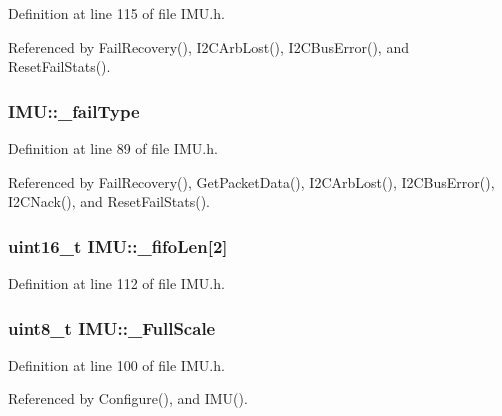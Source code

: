 Definition at line 115 of file IMU.h.



Referenced by FailRecovery(), I2CArbLost(), I2CBusError(), and ResetFailStats().

\hypertarget{class_i_m_u_a39ed63b67b50c67520c5f8e5a2c26b26}{
\subsubsection[{\_\-failType}]{ {\bf IMU::\_\-failType}}}
\label{class_i_m_u_a39ed63b67b50c67520c5f8e5a2c26b26}


Definition at line 89 of file IMU.h.



Referenced by FailRecovery(), GetPacketData(), I2CArbLost(), I2CBusError(), I2CNack(), and ResetFailStats().

\hypertarget{class_i_m_u_a9f7f36da069258a5615886e098527100}{
\subsubsection[{\_\-fifoLen}]{\setlength{\rightskip}{0pt plus 5cm}uint16\_\-t {\bf IMU::\_\-fifoLen}\mbox{[}2\mbox{]}}}
\label{class_i_m_u_a9f7f36da069258a5615886e098527100}


Definition at line 112 of file IMU.h.

\hypertarget{class_i_m_u_a059c02011a10bb90aecc9692ed345771}{
\subsubsection[{\_\-FullScale}]{\setlength{\rightskip}{0pt plus 5cm}uint8\_\-t {\bf IMU::\_\-FullScale}}}
\label{class_i_m_u_a059c02011a10bb90aecc9692ed345771}


Definition at line 100 of file IMU.h.



Referenced by Configure(), and IMU().

